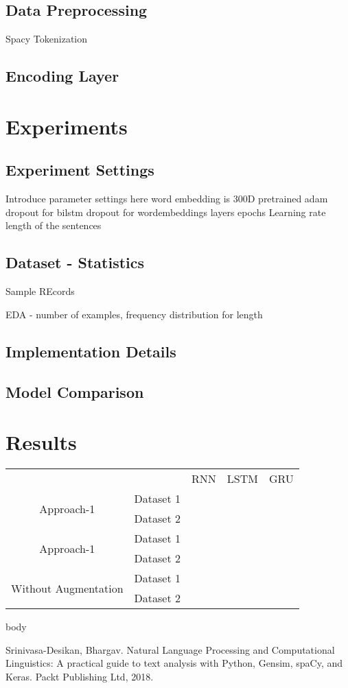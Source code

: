 \documentclass{article}
\begin{document}
\subsection{Data Preprocessing}
Spacy Tokenization \cite{srinivasa2018natural}
\subsection{Encoding Layer}

\section{Experiments}
\subsection{Experiment Settings}
Introduce parameter settings here
word embedding is 300D pretrained
adam
dropout for bilstm
dropout for wordembeddings
layers
epochs
Learning rate 
length of the sentences
\subsection{Dataset - Statistics}
Sample REcords

EDA - number of examples, frequency distribution for length
\subsection{Implementation Details}
\subsection{Model Comparison}

\section{Results}
\begin{table}[]
\begin{tabular}{cllll}
\multicolumn{1}{l}{}                  &           & RNN & LSTM & GRU \\
\multirow{2}{*}{Approach-1}           & Dataset 1 &     &      &     \\
                                      & Dataset 2 &     &      &     \\
\multirow{2}{*}{Approach-1}           & Dataset 1 &     &      &     \\
                                      & Dataset 2 &     &      &     \\
\multirow{2}{*}{Without Augmentation} & Dataset 1 &     &      &     \\
                                      & Dataset 2 &     &      &    
\end{tabular}
\end{table}

body

\begin{thebibliography}{10}

 Srinivasa-Desikan, Bhargav. Natural Language Processing and Computational Linguistics: A practical guide to text analysis with Python, Gensim, spaCy, and Keras. Packt Publishing Ltd, 2018.

\end{thebibliography}
\end{document}
